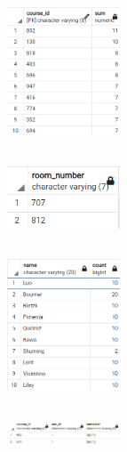 \documentclass{article}
\begin{document}
\subsection{}
\begin{figure}[ht]
    \centering
    \includegraphics[width=0.3\textwidth]{figures/5-d.png}
    \caption
	{
	}
    \label{fig:fig1}
\end{figure}

\subsection{}
\begin{figure}[ht]
    \centering
    \includegraphics[width=0.3\textwidth]{figures/5-e.png}
    \caption
	{
	}
    \label{fig:fig1}
\end{figure}

\subsection{}
\begin{figure}[ht]
    \centering
    \includegraphics[width=0.3\textwidth]{figures/5-f.png}
    \caption
	{
	}
    \label{fig:fig1}
\end{figure}

\subsection{}
\begin{figure}[ht]
    \centering
    \includegraphics[width=0.3\textwidth]{figures/5-g.png}
    \caption
	{
	}
    \label{fig:fig1}
\end{figure}
\end{document}
